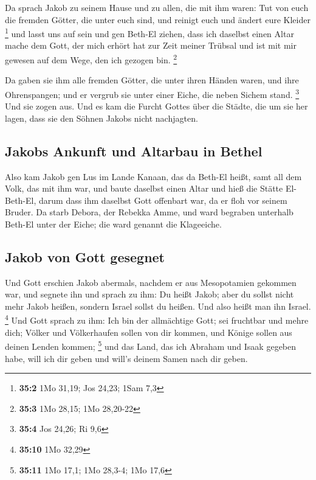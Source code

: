  Da sprach Jakob zu seinem Hause und zu allen, die mit ihm
waren: Tut von euch die fremden Götter, die unter euch sind, und reinigt
euch und ändert eure Kleider \footnote{\textbf{35:2} 1Mo 31,19; Jos
  24,23; 1Sam 7,3}  und lasst uns auf sein und gen Beth-El
ziehen, dass ich daselbst einen Altar mache dem Gott, der mich erhört
hat zur Zeit meiner Trübsal und ist mit mir gewesen auf dem Wege, den
ich gezogen bin. \footnote{\textbf{35:3} 1Mo 28,15; 1Mo 28,20-22}

 Da gaben sie ihm alle fremden Götter, die unter ihren
Händen waren, und ihre Ohrenspangen; und er vergrub sie unter einer
Eiche, die neben Sichem stand. \footnote{\textbf{35:4} Jos 24,26; Ri 9,6}
 Und sie zogen aus. Und es kam die Furcht Gottes über die
Städte, die um sie her lagen, dass sie den Söhnen Jakobs nicht
nachjagten.

\hypertarget{jakobs-ankunft-und-altarbau-in-bethel}{%
\subsection{Jakobs Ankunft und Altarbau in
Bethel}\label{jakobs-ankunft-und-altarbau-in-bethel}}

 Also kam Jakob gen Lus im Lande Kanaan, das da Beth-El
heißt, samt all dem Volk, das mit ihm war,  und baute
daselbst einen Altar und hieß die Stätte El-Beth-El, darum dass ihm
daselbst Gott offenbart war, da er floh vor seinem Bruder.
 Da starb Debora, der Rebekka Amme, und ward begraben
unterhalb Beth-El unter der Eiche; die ward genannt die Klageeiche.

\hypertarget{jakob-von-gott-gesegnet}{%
\subsection{Jakob von Gott gesegnet}\label{jakob-von-gott-gesegnet}}

 Und Gott erschien Jakob abermals, nachdem er aus
Mesopotamien gekommen war, und segnete ihn  und sprach zu
ihm: Du heißt Jakob; aber du sollst nicht mehr Jakob heißen, sondern
Israel sollst du heißen. Und also heißt man ihn Israel. \footnote{\textbf{35:10}
  1Mo 32,29}  Und Gott sprach zu ihm: Ich bin der
allmächtige Gott; sei fruchtbar und mehre dich; Völker und Völkerhaufen
sollen von dir kommen, und Könige sollen aus deinen Lenden kommen;
\footnote{\textbf{35:11} 1Mo 17,1; 1Mo 28,3-4; 1Mo 17,6} 
und das Land, das ich Abraham und Isaak gegeben habe, will ich dir geben
und will's deinem Samen nach dir geben.

